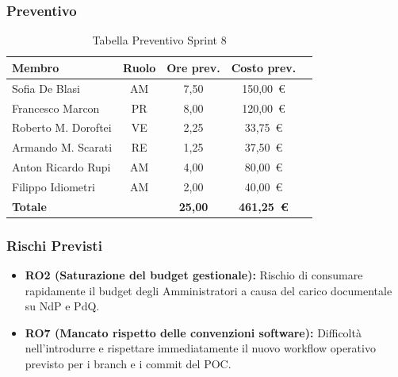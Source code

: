 \subsubsection{Preventivo}
\begin{table}[H]
    \centering
    \renewcommand{\arraystretch}{1.3}
    \begin{tabularx}{\textwidth}{|X|c|c|c|r|}
        \hline
        \textbf{Membro} & \textbf{Ruolo} & \textbf{Ore prev.} & \textbf{Costo prev.} \\
        \hline
        Sofia De Blasi       & AM & 7,50 & 150{,}00~\euro \\
        Francesco Marcon     & PR & 8,00 & 120{,}00~\euro \\
        Roberto M. Doroftei  & VE & 2,25 & 33{,}75~\euro \\
        Armando M. Scarati   & RE & 1,25 & 37{,}50~\euro \\
        Anton Ricardo Rupi   & AM & 4,00 & 80{,}00~\euro \\
        Filippo Idiometri    & AM & 2,00 & 40{,}00~\euro \\
        \hline
        \textbf{Totale}      &    & \textbf{25,00} & \textbf{461{,}25~\euro} \\
        \hline
    \end{tabularx}
    \caption{Tabella Preventivo Sprint 8} 
\end{table}

\subsubsection{Rischi Previsti}
\begin{itemize}
    \item \textbf{RO2 (Saturazione del budget gestionale):} Rischio di consumare rapidamente il budget degli Amministratori a causa del carico documentale su NdP e PdQ.
    \item \textbf{RO7 (Mancato rispetto delle convenzioni software):} Difficoltà nell'introdurre e rispettare immediatamente il nuovo workflow operativo previsto per i branch e i commit del POC.
\end{itemize}

